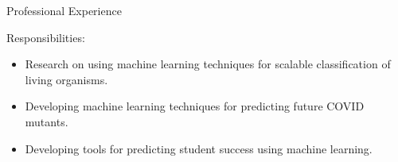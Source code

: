 \begin{rubric}{Professional Experience}
        \par Responsibilities:

        \begin{itemize}[leftmargin=*, noitemsep, topsep=0pt]

            \item Research on using machine learning techniques for scalable classification of living organisms.

            \item Developing machine learning techniques for predicting future COVID mutants.

            \item Developing tools for predicting student success using machine learning.

        \end{itemize}
\end{rubric}

